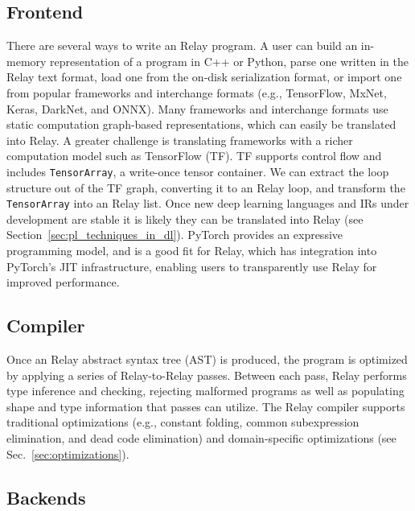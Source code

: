   \subsection*{Frontend}

  There are several ways to write an Relay program.
  A user can build an in-memory representation of
    a program in C++ or Python,
    parse one written in the Relay text format,
    load one from the on-disk serialization format,
    or import one from popular frameworks and interchange formats
      (e.g., TensorFlow, MxNet, Keras, DarkNet, and ONNX).
  Many frameworks and interchange formats use static computation graph-based representations,
    which can easily be translated into Relay.
  A greater challenge is translating frameworks
    with a richer computation model such as TensorFlow (TF).
  TF supports control flow and includes \verb|TensorArray|, a write-once
    tensor container.
  We can extract the loop structure out of the TF graph, converting
    it to an Relay loop, and transform the \verb|TensorArray| into an Relay list.
  Once new deep learning languages and IRs under development
    are stable it is likely they can be translated into Relay (see
    Section~\ref{sec:pl_techniques_in_dl}).
  PyTorch provides an expressive programming model, and is a good fit
    for Relay, which has integration into PyTorch's JIT infrastructure,
    enabling users to transparently use Relay for improved performance.

  \subsection*{Compiler}
  Once an Relay abstract syntax tree (AST) is produced,
    the program is optimized by applying a series of Relay-to-Relay
    passes.
  Between each pass, Relay performs type inference and checking,
    rejecting malformed programs as well as populating shape and type
    information that passes can utilize.
  The Relay compiler supports traditional optimizations
    (e.g., constant folding, common subexpression elimination, and dead code elimination)
    and domain-specific optimizations
    (see Sec.~\ref{sec:optimizations}).

  \subsection*{Backends}

